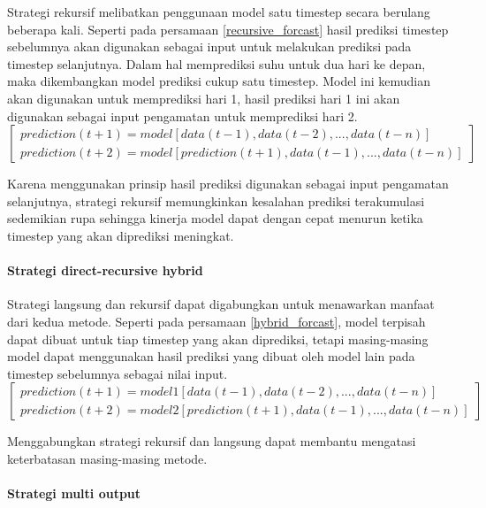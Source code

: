 \documentclass[../thesis.tex]{subfiles}
\begin{document}
Strategi rekursif melibatkan penggunaan model satu timestep secara berulang beberapa kali. Seperti pada persamaan \ref{recursive_forcast} hasil prediksi timestep sebelumnya akan digunakan sebagai input untuk melakukan prediksi pada timestep selanjutnya.
Dalam hal memprediksi suhu untuk dua hari ke depan, maka dikembangkan model prediksi cukup satu timestep. Model ini kemudian akan digunakan untuk memprediksi hari 1, hasil prediksi hari 1 ini akan digunakan sebagai input pengamatan untuk memprediksi hari 2.
\begin{equation} \label{recursive_forcast}
\begin{bmatrix}
		prediction(t+1) = model[data(t-1), data(t-2), ..., data(t-n)]
		\\prediction(t+2) = model[prediction(t+1), data(t-1), ..., data(t-n)]
\end{bmatrix}
\end{equation}

Karena menggunakan prinsip hasil prediksi digunakan sebagai input pengamatan selanjutnya, strategi rekursif memungkinkan kesalahan prediksi terakumulasi sedemikian rupa sehingga kinerja model dapat dengan cepat menurun ketika timestep yang akan diprediksi meningkat.

\paragraph{Strategi direct-recursive hybrid} 

Strategi langsung dan rekursif dapat digabungkan untuk menawarkan manfaat dari kedua metode.
Seperti pada persamaan \ref{hybrid_forcast}, model terpisah dapat dibuat untuk tiap timestep yang akan diprediksi, tetapi masing-masing model dapat menggunakan hasil prediksi yang dibuat oleh model lain pada timestep sebelumnya sebagai nilai input.
\begin{equation} \label{hybrid_forcast}
\begin{bmatrix}
		prediction(t+1) = model1[data(t-1), data(t-2), ..., data(t-n)]
		\\prediction(t+2) = model2[prediction(t+1), data(t-1), ..., data(t-n)]
\end{bmatrix}
\end{equation}

Menggabungkan strategi rekursif dan langsung dapat membantu mengatasi keterbatasan masing-masing metode.

\paragraph{Strategi multi output}
\end{document}
